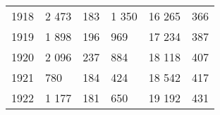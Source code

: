 \documentclass[leqno]{article}  %
\begin{document}
\begin{table}
{\begin{tabular}{p{}|p{}|p{}|p{}|p{}|p{}}
1918 & \hfill 2 473 \hspace*{2.5mm} & \hfill 183 \hspace*{2.5mm} & \hfill 1 350 \hspace*{2.5mm} & \hfill 16 265 \hspace*{2.5mm} & \hfill 366 \hspace*{2.5mm} \\
1919 & \hfill 1 898 \hspace*{2.5mm} & \hfill 196 \hspace*{2.5mm} & \hfill 969 \hspace*{2.5mm} & \hfill 17 234 \hspace*{2.5mm} & \hfill 387 \hspace*{2.5mm} \\
1920 & \hfill 2 096 \hspace*{2.5mm} & \hfill 237 \hspace*{2.5mm} & \hfill 884 \hspace*{2.5mm} & \hfill 18 118 \hspace*{2.5mm} & \hfill 407 \hspace*{2.5mm} \\
1921 & \hfill 780 \hspace*{2.5mm} & \hfill 184 \hspace*{2.5mm} & \hfill 424 \hspace*{2.5mm} & \hfill 18 542 \hspace*{2.5mm} & \hfill 417 \hspace*{2.5mm} \\
1922 & \hfill 1 177 \hspace*{2.5mm} & \hfill 181 \hspace*{2.5mm} & \hfill 650 \hspace*{2.5mm} & \hfill 19 192 \hspace*{2.5mm} & \hfill 431 \hspace*{2.5mm} \\
\hline
\end{tabular}
}
\end{table}
\end{document}
